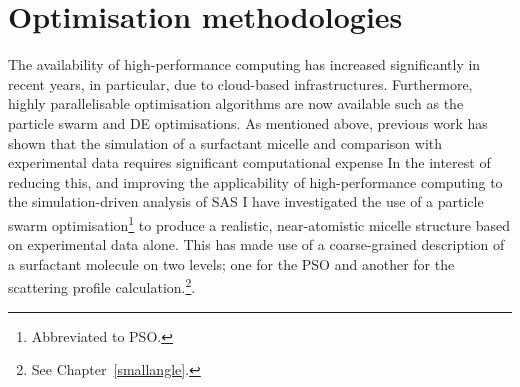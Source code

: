 \section{Optimisation methodologies}
The availability of high-performance computing has increased significantly in recent years, in particular, due to cloud-based infrastructures.
Furthermore, highly parallelisable optimisation algorithms are now available such as the particle swarm\autocite{kennedy_particle_1995,shi_modified_1998} and DE\autocite{storn_differential_1997} optimisations.
As mentioned above, previous work has shown that the simulation of a surfactant micelle and comparison with experimental data requires significant computational expense\autocite{hargreaves_atomistic_2011,ivanovic_temperature-dependent_2018}
In the interest of reducing this, and improving the applicability of high-performance computing to the simulation-driven analysis of SAS I have investigated the use of a particle swarm optimisation\footnote{Abbreviated to PSO.} to produce a realistic, near-atomistic micelle structure based on experimental data alone.
This has made use of a coarse-grained description of a surfactant molecule on two levels; one for the PSO and another for the scattering profile calculation.\footnote{See Chapter~\ref{smallangle}.}.
